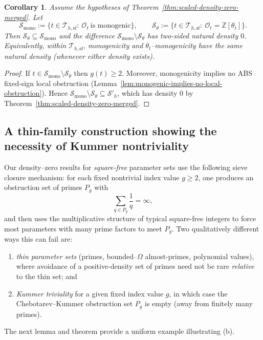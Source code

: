 \documentclass[11pt,letterpaper]{amsart}
\newcommand{\Z}{\mathbb{Z}}
\newcommand{\Ocal}{\mathcal{O}}
\theoremstyle{plain}
\newtheorem{corollary}[theorem]{Corollary}
\theoremstyle{definition}
\theoremstyle{remark}
\theoremstyle{plain}
\begin{document}
\begin{corollary}
\label{cor:scaled-density-equality-merged}
Assume the hypotheses of Theorem~\ref{thm:scaled-density-zero-merged}.
Let
\[
\mathcal{S}_{\mathrm{mono}}
:=\{t\in\mathcal{T}_{h,\mathrm{sf}}:\ \Ocal_t\ \text{is monogenic}\},
\qquad
\mathcal{S}_{\theta}
:=\{t\in\mathcal{T}_{h,\mathrm{sf}}:\ \Ocal_t=\Z[\theta_t]\}.
\]
Then $\mathcal{S}_{\theta}\subseteq \mathcal{S}_{\mathrm{mono}}$ and the difference
$\mathcal{S}_{\mathrm{mono}}\setminus \mathcal{S}_{\theta}$ has two-sided natural density $0$.
Equivalently, within $\mathcal{T}_{h,\mathrm{sf}}$, monogenicity and $\theta_t$--monogenicity have the same
natural density (whenever either density exists).
\end{corollary}

\begin{proof}
If $t\in\mathcal{S}_{\mathrm{mono}}\setminus \mathcal{S}_{\theta}$ then $g(t)\ge 2$.
Moreover, monogenicity implies no \textsc{ABS} fixed-sign local obstruction
(Lemma~\ref{lem:monogenic-implies-no-local-obstruction}).
Hence $\mathcal{S}_{\mathrm{mono}}\setminus \mathcal{S}_{\theta}\subseteq \mathcal{S}'_{h}$, which has density $0$
by Theorem~\ref{thm:scaled-density-zero-merged}.
\end{proof}



\subsection{A thin-family construction showing the necessity of Kummer nontriviality}
\label{subsec:thin-kummer-necessary}

Our density--zero results for \emph{square-free} parameter sets use the following sieve closure mechanism:
for each fixed nontrivial index value $g\ge 2$, one produces an obstruction set of primes $P_g$ with
\[
\sum_{q\in P_g}\frac1q=\infty,
\]
and then uses the multiplicative structure of typical square-free integers to force most parameters
with many prime factors to meet $P_g$.  Two qualitatively different ways this can fail are:
\begin{enumerate}[label=\textup{(\alph*)}]
\item \emph{thin parameter sets} (primes, bounded--$\Omega$ almost-primes, polynomial values), where avoidance of a
positive-density set of primes need not be rare \emph{relative} to the thin set; and
\item \emph{Kummer triviality} for a given fixed index value $g$, in which case the Chebotarev--Kummer obstruction
set $P_g$ is empty (away from finitely many primes).
\end{enumerate}
The next lemma and theorem provide a uniform example illustrating \textup{(b)}.
\end{document}
